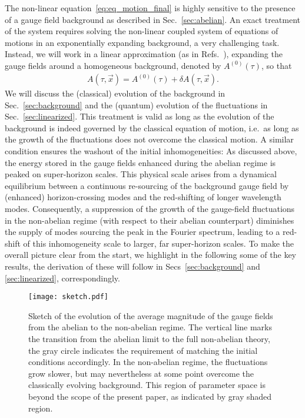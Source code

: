 The non-linear equation~\eqref{eq:eq_motion_final} is highly sensitive to the presence of a gauge field background as described in Sec.~\ref{sec:abelian}. An exact treatment of the system requires solving the non-linear coupled system of equations of motions in an exponentially expanding background, a very challenging task. Instead, we will work in a linear approximation (as in Refs.~\cite{Dimastrogiovanni:2012ew,Adshead:2013qp,Adshead:2013nka}), expanding the gauge fields around a homogeneous background, denoted by $A^{(0)}(\tau)$, so that 
\begin{equation}
\begin{aligned}
\label{eq:background_plus_linear}
A(\tau, \vec x) = A^{(0)}(\tau) + \delta A(\tau, \vec x).
\end{aligned}
\end{equation}
We will discuss the (classical) evolution of the background in Sec.~\ref{sec:background} and the (quantum) evolution of the fluctuations in Sec.~\ref{sec:linearized}. This treatment is valid as long as the evolution of the background is indeed governed by the classical equation of motion, i.e.\ as long as the growth of the fluctuations does not overcome the classical motion.  A similar condition ensures the washout of the initial inhomogeneities: As discussed above, the energy stored in the gauge fields enhanced during the abelian regime is peaked on super-horizon scales. This physical scale arises from a dynamical equilibrium between a continuous re-sourcing of the background gauge field by (enhanced) horizon-crossing modes and the red-shifting of longer wavelength modes. Consequently, a suppression of the growth of the gauge-field fluctuations in the non-abelian regime (with respect to their abelian counterpart) diminishes the supply of modes sourcing the peak in the Fourier spectrum, leading to a red-shift of this inhomogeneity scale to larger, far super-horizon scales. To make the overall picture clear from the start, we highlight in the following some of the key results, the derivation of these will follow in Secs~\ref{sec:background} and \ref{sec:linearized}, correspondingly. 

\begin{figure}[t]
\centering
 \texttt{[image: sketch.pdf]}
 \caption{Sketch of the evolution of the average magnitude of the gauge fields from the abelian to the non-abelian regime. The vertical line marks the transition from the abelian limit to the full non-abelian theory, the gray circle indicates the requirement of matching the initial conditions accordingly. In the non-abelian regime, the fluctuations grow slower, but may nevertheless at some point overcome the classically evolving background. This region of parameter space is beyond the scope of the present paper, as indicated by gray shaded region. }
 \label{fig:sketch}
\end{figure}



